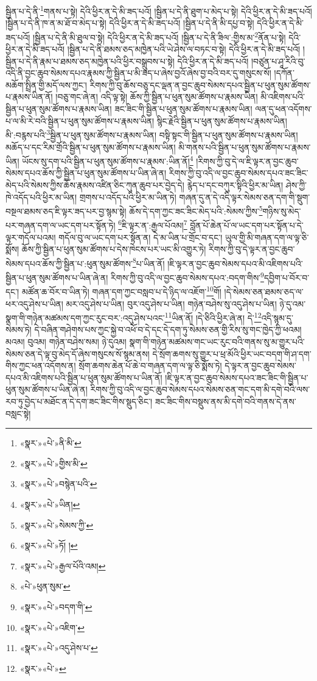སྦྱིན་པ་དེ་ནི་\footnote{«སྣར་»«པེ་»ནི་མི་}གནས་པ་སྟེ། དེའི་ཕྱིར་ན་དེ་མི་ཟད་པའོ། །སྦྱིན་པ་དེ་ནི་ཐུག་པ་མེད་པ་སྟེ། དེའི་ཕྱིར་ན་དེ་མི་ཟད་པའོ། །སྦྱིན་པ་དེ་ནི་ཁ་ན་མ་ཐོ་བ་མེད་པ་སྟེ། དེའི་ཕྱིར་ན་དེ་མི་ཟད་པའོ། །སྦྱིན་པ་དེ་ནི་མི་དཔྱ་བ་སྟེ། དེའི་ཕྱིར་ན་དེ་མི་ཟད་པའོ། །སྦྱིན་པ་དེ་ནི་མི་ཐུལ་བ་སྟེ། དེའི་ཕྱིར་ན་དེ་མི་ཟད་པའོ། །སྦྱིན་པ་དེ་ནི་ཟིལ་:གྱིས་མ་\footnote{«སྣར་»«པེ་»གྱིས་མི་}ནོན་པ་སྟེ། དེའི་ཕྱིར་ན་དེ་མི་ཟད་པའོ། །སྦྱིན་པ་དེ་ནི་ཐམས་ཅད་མཁྱེན་པའི་ཡེ་ཤེས་ལ་བཏང་བ་སྟེ། དེའི་ཕྱིར་ན་དེ་མི་ཟད་པའོ། །སྦྱིན་པ་དེ་ནི་རྣམ་པ་ཐམས་ཅད་མཁྱེན་པའི་ཕྱིར་བསྒྲུབས་པ་སྟེ། དེའི་ཕྱིར་ན་དེ་མི་ཟད་པའོ། །བཙུན་པ་ཤཱ་རིའི་བུ་འདི་ནི་བྱང་ཆུབ་སེམས་དཔའ་རྣམས་ཀྱི་སྦྱིན་པ་མི་ཟད་པ་ཞེས་བྱའོ་ཞེས་བྱ་བའི་བར་དུ་གསུངས་སོ། །དཀོན་མཆོག་སྤྲིན་གྱི་མདོ་ལས་ཀྱང་། རིགས་ཀྱི་བུ་ཆོས་བཅུ་དང་ལྡན་ན་བྱང་ཆུབ་སེམས་དཔའ་སྦྱིན་པ་ཕུན་སུམ་ཚོགས་པ་རྣམས་ཡིན་ནོ། །བཅུ་གང་ཞེ་ན། འདི་ལྟ་སྟེ། ཆོས་ཀྱི་སྦྱིན་པ་ཕུན་སུམ་ཚོགས་པ་རྣམས་ཡིན། མི་འཇིགས་པའི་སྦྱིན་པ་ཕུན་སུམ་ཚོགས་པ་རྣམས་ཡིན། ཟང་ཟིང་གི་སྦྱིན་པ་ཕུན་སུམ་ཚོགས་པ་རྣམས་ཡིན། ལན་དུ་ཕན་འདོགས་པ་ལ་མི་རེ་བའི་སྦྱིན་པ་ཕུན་སུམ་ཚོགས་པ་རྣམས་ཡིན། སྙིང་རྗེའི་སྦྱིན་པ་ཕུན་སུམ་ཚོགས་པ་རྣམས་ཡིན། མི་:བརྙས་པའི་\footnote{«སྣར་»«པེ་»བསྙེན་པའི་}སྦྱིན་པ་ཕུན་སུམ་ཚོགས་པ་རྣམས་ཡིན། བསྟི་སྟང་གི་སྦྱིན་པ་ཕུན་སུམ་ཚོགས་པ་རྣམས་ཡིན། མཆོད་པ་དང་རིམ་གྲོའི་སྦྱིན་པ་ཕུན་སུམ་ཚོགས་པ་རྣམས་ཡིན། མི་གནས་པའི་སྦྱིན་པ་ཕུན་སུམ་ཚོགས་པ་རྣམས་ཡིན། ཡོངས་སུ་དག་པའི་སྦྱིན་པ་ཕུན་སུམ་ཚོགས་པ་རྣམས་:ཡིན་ནོ།\footnote{«སྣར་»«པེ་»ཡིན།} །རིགས་ཀྱི་བུ་དེ་ལ་ཇི་ལྟར་ན་བྱང་ཆུབ་སེམས་དཔའ་ཆོས་ཀྱི་སྦྱིན་པ་ཕུན་སུམ་ཚོགས་པ་ཡིན་ཞེ་ན། རིགས་ཀྱི་བུ་འདི་ལ་བྱང་ཆུབ་སེམས་དཔའ་ཟང་ཟིང་མེད་པའི་སེམས་ཀྱིས་ཆོས་རྣམས་འཛིན་ཅིང་ཀུན་ཆུབ་པར་བྱེད་དེ། རྙེད་པ་དང་བཀུར་སྟིའི་ཕྱིར་མ་ཡིན། ཤེས་ཀྱི་ཁེ་འདོད་པའི་ཕྱིར་མ་ཡིན། གྲགས་པ་འདོད་པའི་ཕྱིར་མ་ཡིན་ཏེ། གཞན་དུ་ན་དེ་འདི་ལྟར་སེམས་ཅན་དག་གི་སྡུག་བསྔལ་ཐམས་ཅད་ཇི་ལྟར་ཟད་པར་བྱ་སྙམ་སྟེ། ཆོས་དེ་དག་ཀྱང་ཟང་ཟིང་མེད་པའི་:སེམས་ཀྱིས་\footnote{«སྣར་»«པེ་»སེམས་ཀྱི་}གཉིས་སུ་མེད་པར་གཞན་དག་ལ་ཡང་དག་པར་སྟོན་ཏེ། \footnote{«སྣར་»«པེ་»ཏོ། ། }ཇི་ལྟར་ན་:རྒྱལ་པོའམ།\footnote{«སྣར་»«པེ་»རྒྱལ་པོའི་འམ།} བློན་པོ་ཆེན་པོ་ལ་ཡང་དག་པར་སྟོན་པ་དེ་ལྟར་གདོལ་པའམ། གདོལ་བུ་ལ་ཡང་དག་པར་སྟོན་ན། དེ་མ་ཡིན་པ་གྲོང་བ་དང་། ཡུལ་གྱི་མི་གཞན་དག་ལ་ལྟ་ཅི་སྨོས། ཆོས་ཀྱི་སྦྱིན་པ་ཕུན་སུམ་ཚོགས་པ་དེས་ཁེངས་པར་ཡང་མི་འགྱུར་ཏེ། རིགས་ཀྱི་བུ་དེ་ལྟར་ན་བྱང་ཆུབ་སེམས་དཔའ་ཆོས་ཀྱི་སྦྱིན་པ་:ཕུན་སུམ་ཚོགས་\footnote{«པེ་»ཕུན་སུམ་}པ་ཡིན་ནོ། །ཇི་ལྟར་ན་བྱང་ཆུབ་སེམས་དཔའ་མི་འཇིགས་པའི་སྦྱིན་པ་ཕུན་སུམ་ཚོགས་པ་ཡིན་ཞེ་ན། རིགས་ཀྱི་བུ་འདི་ལ་བྱང་ཆུབ་སེམས་དཔའ་:བདག་གིས་\footnote{«སྣར་»«པེ་»བདག་གི་}དབྱིག་པ་བོར་བ་དང་། མཚོན་ཆ་བོར་བ་ཡིན་ཏེ། གཞན་དག་ཀྱང་བསླབ་པ་དེ་ཉིད་ལ་འཇོག་\footnote{«སྣར་»«པེ་»འཇིག་}གོ། །དེ་སེམས་ཅན་ཐམས་ཅད་ལ་ཕར་འདུ་ཤེས་པ་ཡིན། མར་འདུ་ཤེས་པ་ཡིན། བུར་འདུ་ཤེས་པ་ཡིན། གཉེན་བཤེས་སུ་འདུ་ཤེས་པ་ཡིན། ཉེ་དུ་འམ་སྣག་གི་གཉེན་མཚམས་དག་ཀྱང་རུང་བར་:འདུ་ཤེས་པའང་\footnote{«སྣར་»«པེ་»འདུ་ཤེས་པ་}ཡིན་ནོ། །དེ་ཅིའི་ཕྱིར་ཞེ་ན། དེ་\footnote{«སྣར་»«པེ་»}འདི་སྙམ་དུ་སེམས་ཏེ། དེ་བཞིན་གཤེགས་པས་ཀྱང་སྐྱེ་བ་འཕོ་བ་དེ་དང་དེ་དག་ཏུ་སེམས་ཅན་གྱི་རིས་སུ་གང་ཁྱེད་ཀྱི་ཕའམ། མའམ། བུའམ། གཉེན་བཤེས་སམ། ཉེ་དུའམ། སྣག་གི་གཉེན་མཚམས་གང་ཡང་རུང་བའི་གནས་སུ་མ་གྱུར་པའི་སེམས་ཅན་དེ་ལྟ་བུ་མེད་དོ་ཞེས་གསུངས་སོ་སྙམ་ནས། དེ་སྲོག་ཆགས་སུ་གྱུར་པ་ཕྲ་མོའི་ཕྱིར་ཡང་བདག་གི་ཤ་དག་གིས་ཀྱང་ཕན་འདོགས་ན། སྲོག་ཆགས་ཆེན་པོ་ཆེ་བ་གཞན་དག་ལ་ལྟ་ཅི་སྨོས་ཏེ། དེ་ལྟར་ན་བྱང་ཆུབ་སེམས་དཔའ་མི་འཇིགས་པའི་སྦྱིན་པ་ཕུན་སུམ་ཚོགས་པ་ཡིན་ནོ། །ཇི་ལྟར་ན་བྱང་ཆུབ་སེམས་དཔའ་ཟང་ཟིང་གི་སྦྱིན་པ་ཕུན་སུམ་ཚོགས་པ་ཡིན་ཞེ་ན། རིགས་ཀྱི་བུ་འདི་ལ་བྱང་ཆུབ་སེམས་དཔའ་སེམས་ཅན་གང་དག་མི་དགེ་བའི་ལས་རབ་ཏུ་བྱེད་པ་མཐོང་ན་དེ་དག་ཟང་ཟིང་གིས་སྡུད་ཅིང་། ཟང་ཟིང་གིས་བསྡུས་ནས་མི་དགེ་བའི་གནས་དེ་ནས་བསླང་སྟེ། 
